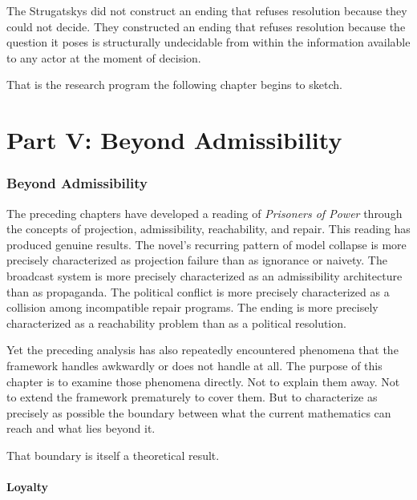 \documentclass[12pt, a4paper]{article}
\theoremstyle{plain}
\theoremstyle{definition}
\theoremstyle{remark}
\begin{document}
The Strugatskys did not construct an ending
that refuses resolution because they could not
decide. They constructed an ending that refuses
resolution because the question it poses is
structurally undecidable from within the
information available to any actor at the moment
of decision.

That is the research program the following
chapter begins to sketch.

\newpage
\part*{Part V: Beyond Admissibility}

\section{Beyond Admissibility}

The preceding chapters have developed a reading
of \textit{Prisoners of Power} through the concepts
of projection, admissibility, reachability, and
repair. This reading has produced genuine results.
The novel's recurring pattern of model collapse
is more precisely characterized as projection
failure than as ignorance or naivety. The broadcast
system is more precisely characterized as an
admissibility architecture than as propaganda.
The political conflict is more precisely
characterized as a collision among incompatible
repair programs. The ending is more precisely
characterized as a reachability problem than as
a political resolution.

Yet the preceding analysis has also repeatedly
encountered phenomena that the framework handles
awkwardly or does not handle at all. The purpose
of this chapter is to examine those phenomena
directly. Not to explain them away. Not to extend
the framework prematurely to cover them. But to
characterize as precisely as possible the boundary
between what the current mathematics can reach
and what lies beyond it.

That boundary is itself a theoretical result.

\subsection{Loyalty}
\end{document}
